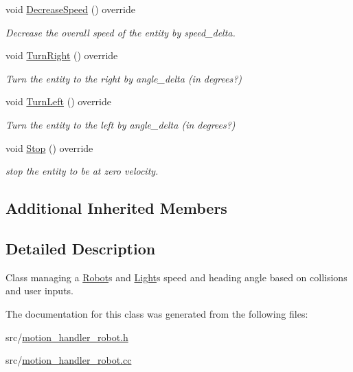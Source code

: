 \begin{DoxyCompactItemize}
void \mbox{\hyperlink{class_motion_handler_robot_a89e9b8b4e22fb021d7d67c817e66b7b2}{Decrease\+Speed}} () override
\begin{DoxyCompactList}\small\item\em Decrease the overall speed of the entity by speed\+\_\+delta. \end{DoxyCompactList}\item 
\mbox{\label{class_motion_handler_robot_a4b18204b7c7f7f8a3cbb7f0e8ccf088f}} 
void \mbox{\hyperlink{class_motion_handler_robot_a4b18204b7c7f7f8a3cbb7f0e8ccf088f}{Turn\+Right}} () override
\begin{DoxyCompactList}\small\item\em Turn the entity to the right by angle\+\_\+delta (in degrees?) \end{DoxyCompactList}\item 
\mbox{\label{class_motion_handler_robot_a955ca2693c4188ffb08cfde469e58252}} 
void \mbox{\hyperlink{class_motion_handler_robot_a955ca2693c4188ffb08cfde469e58252}{Turn\+Left}} () override
\begin{DoxyCompactList}\small\item\em Turn the entity to the left by angle\+\_\+delta (in degrees?) \end{DoxyCompactList}\item 
\mbox{\label{class_motion_handler_robot_a735287a2ab240ae0655def3afb0839f1}} 
void \mbox{\hyperlink{class_motion_handler_robot_a735287a2ab240ae0655def3afb0839f1}{Stop}} () override
\begin{DoxyCompactList}\small\item\em stop the entity to be at zero velocity. \end{DoxyCompactList}\end{DoxyCompactItemize}
\subsection*{Additional Inherited Members}


\subsection{Detailed Description}
Class managing a \mbox{\hyperlink{class_robot}{Robot}}\textquotesingle{}s and \mbox{\hyperlink{class_light}{Light}}\textquotesingle{}s speed and heading angle based on collisions and user inputs. 

The documentation for this class was generated from the following files\+:\begin{DoxyCompactItemize}
\item 
src/\mbox{\hyperlink{motion__handler__robot_8h}{motion\+\_\+handler\+\_\+robot.\+h}}\item 
src/\mbox{\hyperlink{motion__handler__robot_8cc}{motion\+\_\+handler\+\_\+robot.\+cc}}\end{DoxyCompactItemize}

